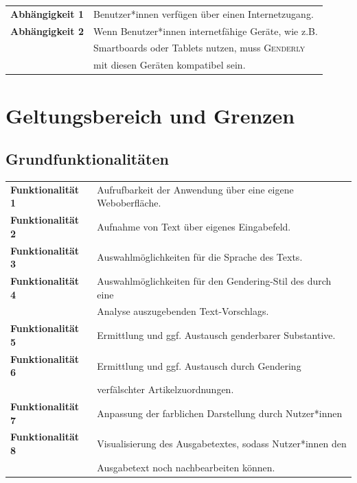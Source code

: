\documentclass[paper=a4, parskip=half]{scrreprt}
\begin{document}
\begin{table}[!htb]
\begin{tabular}{ll}
\textbf{Abhängigkeit 1} & Benutzer*innen verfügen über einen Internetzugang. \vspace{0.15cm} \\
\textbf{Abhängigkeit 2} & Wenn Benutzer*innen internetfähige Geräte, wie z.B. \\
& Smartboards oder Tablets nutzen, muss \textsc{Genderly}\\
& mit diesen Geräten kompatibel sein. \vspace{0.15cm}\\
\end{tabular}
\end{table}

\chapter{Geltungsbereich und Grenzen}
\section{Grundfunktionalitäten}
\label{sec:Grundfunktionalitäten}

\begin{table}[!htb]
\begin{tabular}{ll}
\textbf{Funktionalität 1} & Aufrufbarkeit der Anwendung über eine eigene Weboberfläche. \vspace{0.1cm} \\
\textbf{Funktionalität 2} & Aufnahme von Text über eigenes Eingabefeld. \vspace{0.1cm} \\
\textbf{Funktionalität 3} & Auswahlmöglichkeiten für die Sprache des Texts. \vspace{0.1cm} \\
\textbf{Funktionalität 4} & Auswahlmöglichkeiten für den Gendering-Stil des durch eine \\
 & Analyse auszugebenden Text-Vorschlags. \vspace{0.1cm} \\
\textbf{Funktionalität 5} & Ermittlung und ggf. Austausch genderbarer Substantive. \vspace{0.1cm} \\
\textbf{Funktionalität 6} & Ermittlung und ggf. Austausch durch Gendering \\
& verfälschter Artikelzuordnungen. \vspace{0.1cm} \\
\textbf{Funktionalität 7} & Anpassung der farblichen Darstellung durch Nutzer*innen \vspace{0.1cm} \\
\textbf{Funktionalität 8} & Visualisierung des Ausgabetextes, sodass Nutzer*innen den \\
 & Ausgabetext noch nachbearbeiten können. \vspace{0.1cm} \\
\end{tabular}
\end{table}
\end{document}
